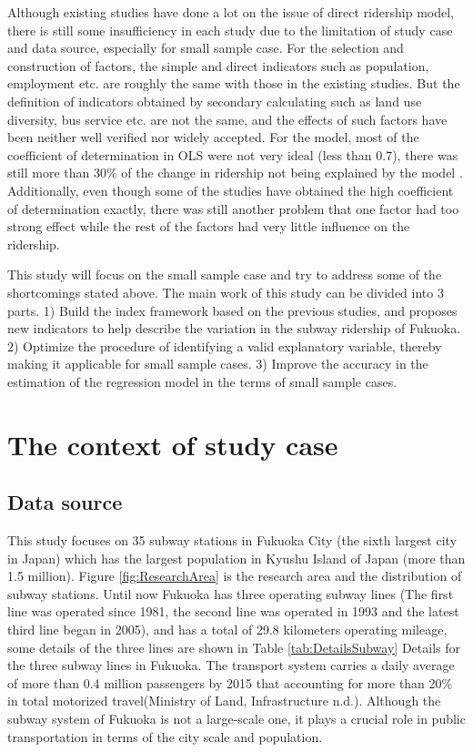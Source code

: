 \documentclass[utf8]{article}
\begin{document}
Although existing studies have done a lot on the issue of direct ridership model, there is still some insufficiency in each study due to the limitation of study case and data source, especially for small sample case. For the selection and construction of factors, the simple and direct indicators such as population, employment etc. are roughly the same with those in the existing studies. But the definition of indicators obtained by secondary calculating such as land use diversity, bus service etc. are not the same, and the effects of such factors have been neither well verified nor widely accepted. For the model, most of the coefficient of determination in OLS were not very ideal (less than 0.7), there was still more than 30\% of the change in ridership not being explained by the model \cite{Gutierrez2011,Jun2015}. Additionally, even though some of the studies have obtained the high coefficient of determination exactly, there was still another problem that one factor had too strong effect while the rest of the factors had very little influence on the ridership.

%
This study will focus on the small sample case and try to address some of the shortcomings stated above. The main work of this study can be divided into 3 parts. 1) Build the index framework based on the previous studies, and proposes new indicators to help describe the variation in the subway ridership of Fukuoka. 2) Optimize the procedure of identifying a valid explanatory variable, thereby making it applicable for small sample cases. 3) Improve the accuracy in the estimation of the regression model in the terms of small sample cases.

\section{The context of study case}
\subsection{Data source}
\indent

This study focuses on 35 subway stations in Fukuoka City (the sixth largest city in Japan) which has the largest population in Kyushu Island of Japan (more than 1.5 million). Figure \ref{fig:ResearchArea} is the research area and the distribution of subway stations. Until now Fukuoka has three operating subway lines (The first line was operated since 1981, the second line was operated in 1993 and the latest third line began in 2005), and has a total of 29.8 kilometers operating mileage, some details of the three lines are shown in Table \ref{tab:DetailsSubway} Details for the three subway lines in Fukuoka. The transport system carries a daily average of more than 0.4 million passengers by 2015 that accounting for more than 20\% in total motorized travel(Ministry of Land, Infrastructure n.d.). Although the subway system of Fukuoka is not a large-scale one, it plays a crucial role in public transportation in terms of the city scale and population.
\end{document}
